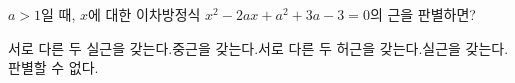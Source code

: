 $a>1$일 때, $x$에 대한 이차방정식 $x^2-2ax+a^2+3a-3=0$의 근을 판별하면?
\begin{choicesv}{서로 다른 두 실근을 갖는다.}{중근을 갖는다.}{서로 다른 두 허근을 갖는다.}{실근을 갖는다.}{판별할 수 없다.}\end{choicesv}
